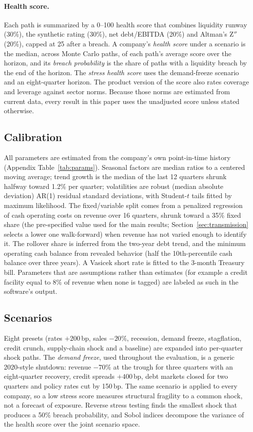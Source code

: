 \paragraph{Health score.} Each path is summarized by a 0--100 health score that combines liquidity runway (30\%), the synthetic rating (30\%), net debt/EBITDA (20\%) and Altman's Z$''$ \citep{altman2006} (20\%), capped at 25 after a breach. A company's \emph{health score} under a scenario is the median, across Monte Carlo paths, of each path's average score over the horizon, and its \emph{breach probability} is the share of paths with a liquidity breach by the end of the horizon. The \emph{stress health score} uses the demand-freeze scenario and an eight-quarter horizon. The product version of the score also rates coverage and leverage against sector norms. Because those norms are estimated from current data, every result in this paper uses the unadjusted score unless stated otherwise.

\subsection{Calibration}
All parameters are estimated from the company's own point-in-time history (Appendix Table~\ref{tab:params}). Seasonal factors are median ratios to a centered moving average; trend growth is the median of the last 12 quarters shrunk halfway toward 1.2\% per quarter; volatilities are robust (median absolute deviation) AR(1) residual standard deviations, with Student-$t$ tails fitted by maximum likelihood. The fixed/variable split comes from a penalized regression of cash operating costs on revenue over 16 quarters, shrunk toward a 35\% fixed share (the pre-specified value used for the main results; Section~\ref{sec:transmission} selects a lower one walk-forward) when revenue has not varied enough to identify it. The rollover share is inferred from the two-year debt trend, and the minimum operating cash balance from revealed behavior (half the 10th-percentile cash balance over three years). A Vasicek short rate \citep{vasicek1977} is fitted to the 3-month Treasury bill. Parameters that are assumptions rather than estimates (for example a credit facility equal to 8\% of revenue when none is tagged) are labeled as such in the software's output.

\subsection{Scenarios}
Eight presets (rates $+200$\,bp, sales $-20\%$, recession, demand freeze, stagflation, credit crunch, supply-chain shock and a baseline) are expanded into per-quarter shock paths. The \emph{demand freeze}, used throughout the evaluation, is a generic 2020-style shutdown: revenue $-70\%$ at the trough for three quarters with an eight-quarter recovery, credit spreads $+400$\,bp, debt markets closed for two quarters and policy rates cut by 150\,bp. The same scenario is applied to every company, so a low stress score measures structural fragility to a common shock, not a forecast of exposure. Reverse stress testing finds the smallest shock that produces a 50\% breach probability, and Sobol indices \citep{sobol2001,saltelli2010} decompose the variance of the health score over the joint scenario space.
